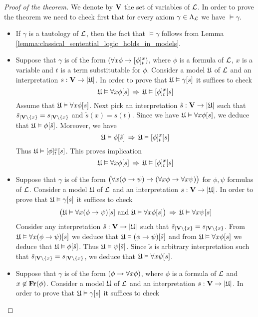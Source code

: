 \begin{proof}[Proof of the theorem]
We denote by $\mathbf{V}$ the set of variables of ${\mathcal L}$. In order to prove the theorem we need to check first that for every axiom $\gamma \in \Lambda_{{\mathcal L}}$ we have $\vDash \gamma$.
\begin{itemize}
\item If $\gamma$ is a tautology of ${\mathcal L}$, then the fact that $\vDash \gamma$ follows from Lemma \ref{lemma:classical_sentential_logic_holds_in_models}.
\item Suppose that $\gamma$ is of the form $\left(\forall x\phi \rightarrow [\phi]^x_t\right)$, where $\phi$ is a formula of ${\mathcal L}$, $x$ is a variable and $t$ is a term substitutable for $\phi$. Consider a model ${\mathfrak U}$ of ${\mathcal L}$ and an interpretation $s:\mathbf{V} \rightarrow |{\mathfrak U}|$. In order to prove that ${\mathfrak U} \vDash \gamma[s]$ it suffices to check
$${\mathfrak U} \vDash \forall x\phi[s] \,\Rightarrow\,  {\mathfrak U} \vDash [\phi]^x_t[s]$$
Assume that ${\mathfrak U} \vDash \forall x\phi[s]$. Next pick an interpretation $\tilde{s}: \mathbf{V} \rightarrow |{\mathfrak U}|$ such that $\tilde{s}_{\mid \mathbf{V}\setminus \{x\}} =s_{\mid \mathbf{V}\setminus \{x\}}$ and $\tilde{s}(x) = s(t)$. Since we have ${\mathfrak U} \vDash \forall x\phi[s]$, we deduce that ${\mathfrak U} \vDash \phi[\tilde{s}]$. Moreover, we have
$${\mathfrak U} \vDash \phi[\tilde{s}] \,\Rightarrow\,{\mathfrak U} \vDash [\phi]^x_t[s]$$
Thus ${\mathfrak U} \vDash [\phi]^x_t[s]$. This proves implication
$${\mathfrak U} \vDash \forall x\phi[s] \,\Rightarrow\, {\mathfrak U} \vDash [\phi]^x_t[s]$$
\item Suppose that $\gamma$ is of the form $\big(\forall x (\phi \rightarrow \psi) \rightarrow (\forall x\phi \rightarrow \forall x\psi)\big)$ for $\phi, \psi$ formulas of ${\mathcal L}$. Consider a model ${\mathfrak U}$ of ${\mathcal L}$ and an interpretation $s:\mathbf{V} \rightarrow |{\mathfrak U}|$. In order to prove that ${\mathfrak U} \vDash \gamma[s]$ it suffices to check
$$\big({\mathfrak U} \vDash \forall x (\phi \rightarrow \psi) [s]\mbox{ and }{\mathfrak U} \vDash \forall x\phi[s]\big) \,\Rightarrow\, {\mathfrak U} \vDash \forall x\psi[s]$$
Consider any interpretation $\tilde{s}:\mathbf{V} \rightarrow |{\mathfrak U}|$ such that $\tilde{s}_{\mid \mathbf{V}\setminus \{x\}} = s_{\mid \mathbf{V}\setminus \{x\}}$. From ${\mathfrak U} \vDash \forall x (\phi \rightarrow \psi) [s]$ we deduce that ${\mathfrak U} \vDash (\phi \rightarrow \psi) [\tilde{s}]$ and from ${\mathfrak U} \vDash \forall x\phi[s]$ we deduce that ${\mathfrak U} \vDash \phi[\tilde{s}]$. Thus ${\mathfrak U} \vDash \psi[\tilde{s}]$. Since $\tilde{s}$ is arbitrary interpretation such that $\tilde{s}_{\mid \mathbf{V}\setminus \{x\}} = s_{\mid \mathbf{V}\setminus \{x\}}$, we deduce that ${\mathfrak U} \vDash \forall x\psi[s]$.
\item Suppose that $\gamma$ is of the form $\left(\phi \rightarrow \forall x\phi\right)$, where $\phi$ is a formula of ${\mathcal L}$ and $x \not \in \mathbf{Fr}(\phi)$. Consider a model ${\mathfrak U}$ of ${\mathcal L}$ and an interpretation $s:\mathbf{V} \rightarrow |{\mathfrak U}|$. In order to prove that ${\mathfrak U} \vDash \gamma[s]$ it suffices to check

\end{itemize}
\end{proof}
